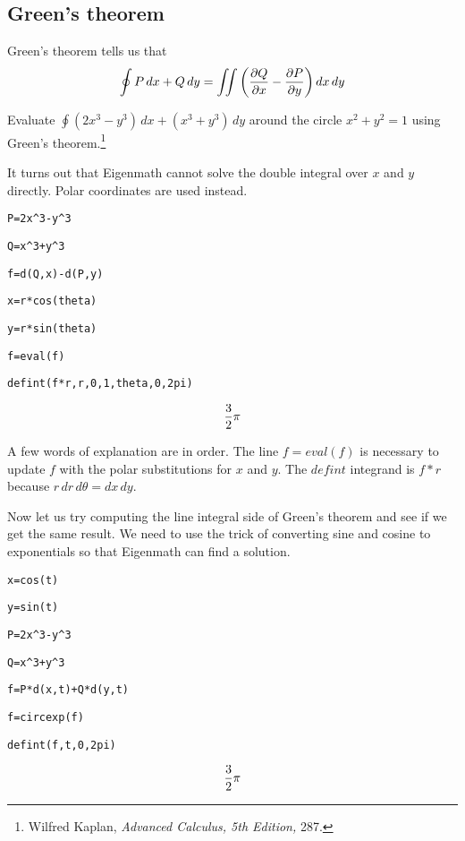\subsection{Green's theorem}
Green's theorem tells us that
$$\oint P\,dx+Q\,dy=\int\!\!\!\int
\left({\partial Q\over\partial x}-{\partial P\over\partial y}\right)
dx\,dy$$

\noindent
Evaluate $\oint (2x^3-y^3)\,dx+(x^3+y^3)\,dy$ around the circle
$x^2+y^2=1$ using Green's theorem.\footnote{
Wilfred Kaplan, {\it Advanced Calculus, 5th Edition,} 287.}

\medskip
\noindent
It turns out that Eigenmath cannot solve the double integral over
$x$ and $y$ directly.
Polar coordinates are used instead.

\medskip
\verb$P=2x^3-y^3$

\verb$Q=x^3+y^3$

\verb$f=d(Q,x)-d(P,y)$

\verb$x=r*cos(theta)$

\verb$y=r*sin(theta)$

\verb$f=eval(f)$

\verb$defint(f*r,r,0,1,theta,0,2pi)$

$${3\over2}\pi$$

\medskip
\noindent
A few words of explanation are in order.
The line $f=eval(f)$ is necessary to update $f$ with the polar
substitutions for
$x$ and $y$.
The $defint$ integrand is $f{*}r$ because $r\,dr\,d\theta=dx\,dy$.

\medskip
\noindent
Now let us try computing the line integral side of Green's theorem
and see if we get the same result.
We need to use the trick of converting sine and cosine to exponentials
so that Eigenmath can find a solution.

\medskip
\verb$x=cos(t)$

\verb$y=sin(t)$

\verb$P=2x^3-y^3$

\verb$Q=x^3+y^3$

\verb$f=P*d(x,t)+Q*d(y,t)$

\verb$f=circexp(f)$

\verb$defint(f,t,0,2pi)$

$${3\over2}\pi$$

